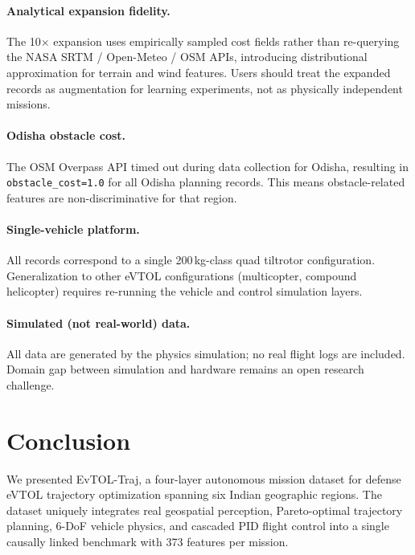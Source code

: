 ﻿\documentclass{article}
\begin{document}
\paragraph{Analytical expansion fidelity.}
The 10$\times$ expansion uses empirically sampled cost fields rather than
re-querying the NASA SRTM / Open-Meteo / OSM APIs, introducing distributional
approximation for terrain and wind features. Users should treat the expanded
records as augmentation for learning experiments, not as physically independent
missions.

\paragraph{Odisha obstacle cost.}
The OSM Overpass API timed out during data collection for Odisha, resulting
in \texttt{obstacle\_cost=1.0} for all Odisha planning records. This means
obstacle-related features are non-discriminative for that region.

\paragraph{Single-vehicle platform.}
All records correspond to a single 200\,kg-class quad tiltrotor configuration.
Generalization to other eVTOL configurations (multicopter, compound helicopter)
requires re-running the vehicle and control simulation layers.

\paragraph{Simulated (not real-world) data.}
All data are generated by the physics simulation; no real flight logs are
included. Domain gap between simulation and hardware remains an open research challenge.

\section{Conclusion}
\label{sec:conclusion}

We presented EvTOL-Traj, a four-layer autonomous mission dataset for defense
eVTOL trajectory optimization spanning six Indian geographic regions.
The dataset uniquely integrates real geospatial perception, Pareto-optimal
trajectory planning, 6-DoF vehicle physics, and cascaded PID flight control
into a single causally linked benchmark with 373 features per mission.
\end{document}
